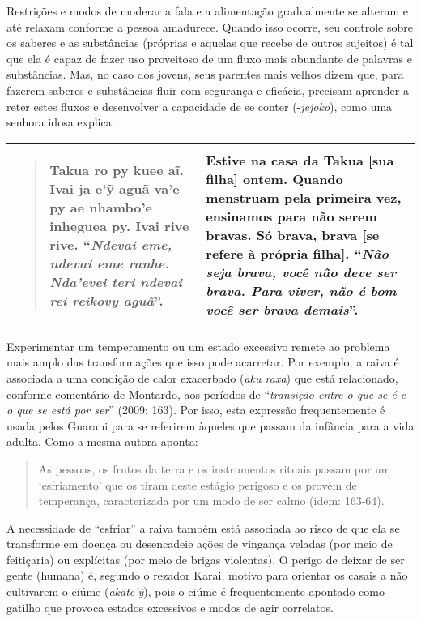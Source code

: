 Restrições e modos de moderar a fala e a alimentação gradualmente se
alteram e até relaxam conforme a pessoa amadurece. Quando isso ocorre,
seu controle sobre os saberes e as substâncias (próprias e aquelas que
recebe de outros sujeitos) é tal que ela é capaz de fazer uso proveitoso
de um fluxo mais abundante de palavras e substâncias. Mas, no caso dos
jovens, seus parentes mais velhos dizem que, para fazerem saberes e
substâncias fluir com segurança e eficácia, precisam aprender a reter
estes fluxos e desenvolver a capacidade de se conter (-\emph{jejoko}),
como uma senhora idosa explica:

\begin{longtable}[]{@{}ll@{}}
\toprule
\begin{minipage}[t]{0.48\columnwidth}\raggedright\strut
\begin{quote}
Takua ro py kuee aĩ. Ivai ja e'ỹ aguã va'e py ae nhambo'e inheguea py.
Ivai rive rive. ``\emph{Ndevai eme, ndevai eme ranhe. Nda'evei teri
ndevai rei reikovy aguã}''.
\end{quote}\strut
\end{minipage} & \begin{minipage}[t]{0.48\columnwidth}\raggedright\strut
Estive na casa da Takua {[}sua filha{]} ontem. Quando menstruam pela
primeira vez, ensinamos para não serem bravas. Só brava, brava {[}se
refere à própria filha{]}. ``\emph{Não seja brava, você não deve ser
brava. Para viver, não é bom você ser brava demais}''.\strut
\end{minipage}\tabularnewline
\bottomrule
\end{longtable}

Experimentar um temperamento ou um estado excessivo remete ao problema
mais amplo das transformações que isso pode acarretar. Por exemplo, a
raiva é associada a uma condição de calor exacerbado (\emph{aku raxa})
que está relacionado, conforme comentário de Montardo, aos períodos de
``\emph{transição entre o que se é e o que se está por ser}'' (2009:
163). Por isso, esta expressão frequentemente é usada pelos Guarani para
se referirem àqueles que passam da infância para a vida adulta. Como a
mesma autora aponta:

\begin{quote}
As pessoas, os frutos da terra e os instrumentos rituais passam por um
`esfriamento' que os tiram deste estágio perigoso e os provém de
temperança, caracterizada por um modo de ser calmo (idem: 163-64).
\end{quote}

A necessidade de ``esfriar'' a raiva também está associada ao risco de
que ela se transforme em doença ou desencadeie ações de vingança veladas
(por meio de feitiçaria) ou explícitas (por meio de brigas violentas). O
perigo de deixar de ser gente (humana) é, segundo o rezador Karai,
motivo para orientar os casais a não cultivarem o ciúme
(\emph{akãte'ỹ}), pois o ciúme é frequentemente apontado como gatilho
que provoca estados excessivos e modos de agir correlatos.

